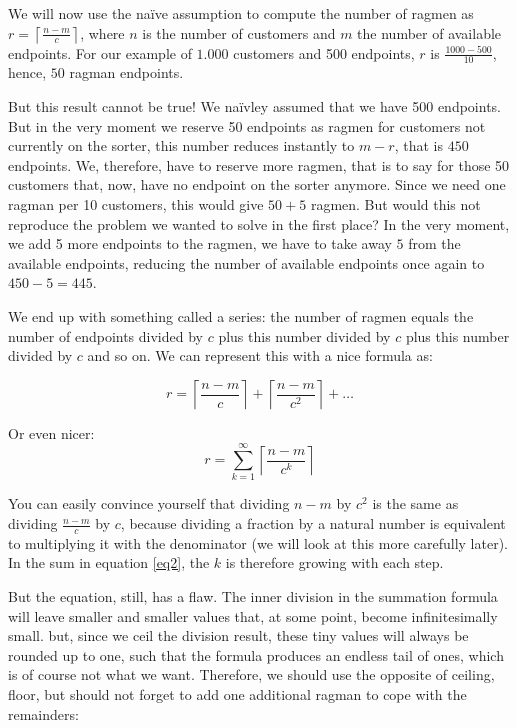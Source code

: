 \documentclass{scrreprt}
\begin{document}
We will now use the na\"ive assumption
to compute the number of ragmen 
as $r = \left\lceil\frac{n-m}{c}\right\rceil$,
where $n$ is the number of customers
and $m$ the number of available endpoints.
For our example 
of $\num{1,000}$ customers and 500 endpoints,
$r$ is $\frac{1000 - 500}{10}$,
hence, $50$ ragman endpoints.

But this result cannot be true!
We na\"ivley assumed that we have 500 endpoints.
But in the very moment
we reserve 50 endpoints as ragmen
for customers not currently on the sorter,
this number reduces instantly to $m - r$,
that is $450$ endpoints.
We, therefore, have to reserve more ragmen,
that is to say for those 50 customers that, now,
have no endpoint on the sorter anymore.
Since we need one ragman per 10 customers,
this would give $50 + 5$ ragmen.
But would this not reproduce the problem
we wanted to solve in the first place?
In the very moment, we add 5 more endpoints
to the ragmen, we have to take away $5$
from the available endpoints,
reducing the number of available endpoints once again
to $450-5 = 445$.

We end up with something called a series:
the number of ragmen equals
the number of endpoints divided by $c$ 
plus this number divided by $c$ 
plus this number divided by $c$ 
and so on. We can represent this with a nice formula as:

\begin{equation}
r = \left\lceil\frac{n - m}{c}\right\rceil 
  + \left\lceil\frac{n - m}{c^2}\right\rceil 
  + \dots
\end{equation}

Or even nicer:
\begin{equation}\label{eq2}
r = \sum_{k=1}^{\infty}\left\lceil\frac{n - m}{c^k}\right\rceil 
\end{equation}

You can easily convince yourself
that dividing $n - m$ by $c^2$ is the same
as dividing $\frac{n - m}{c}$ by $c$,
because dividing a fraction by a natural number
is equivalent to multiplying it with the denominator
(we will look at this more carefully later).
In the sum in equation \ref{eq2},
the $k$ is therefore growing with each step.

But the equation, still, has a flaw.
The inner division in the summation formula
will leave smaller and smaller values
that, at some point, become infinitesimally small.
but, since we ceil the division result,
these tiny values will always be rounded up
to one, such that the formula produces
an endless tail of ones,
which is of course not what we want.
Therefore, we should use the opposite of ceiling,
floor, but should not forget to add one additional
ragman to cope with the remainders:
\end{document}
